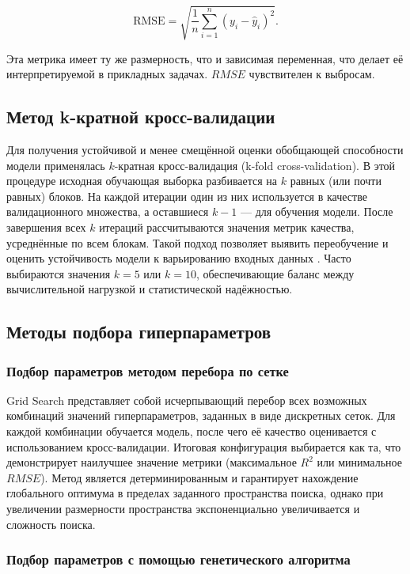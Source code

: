 \begin{equation}\label{ch1:RMSE}
\text{RMSE} = \sqrt{\frac{1}{n} \sum_{i=1}^{n} (y_i - \hat{y}_i)^2}.
\end{equation}

Эта метрика имеет ту же размерность, что и зависимая переменная, что делает её интерпретируемой в прикладных задачах. $RMSE$ чувствителен к выбросам.

\subsection{Метод k-кратной кросс-валидации}

Для получения устойчивой и менее смещённой оценки обобщающей способности модели применялась $k$-кратная кросс-валидация (k-fold cross-validation). В этой процедуре исходная обучающая выборка разбивается на $k$ равных (или почти равных) блоков. На каждой итерации один из них используется в качестве валидационного множества, а оставшиеся $k-1$ --- для обучения модели. После завершения всех $k$ итераций рассчитываются значения метрик качества, усреднённые по всем блокам. Такой подход позволяет выявить переобучение и оценить устойчивость модели к варьированию входных данных \cite{hastie2009elements}. Часто выбираются значения $k=5$ или $k=10$, обеспечивающие баланс между вычислительной нагрузкой и статистической надёжностью.

\subsection{Методы подбора гиперпараметров}


\subsubsection{Подбор параметров методом перебора по сетке}

Grid Search представляет собой исчерпывающий перебор всех возможных комбинаций значений гиперпараметров, заданных в виде дискретных сеток. Для каждой комбинации обучается модель, после чего её качество оценивается с использованием кросс-валидации. Итоговая конфигурация выбирается как та, что демонстрирует наилучшее значение метрики (максимальное $R^2$ или минимальное $RMSE$). Метод является детерминированным и гарантирует нахождение глобального оптимума в пределах заданного пространства поиска, однако при увеличении размерности пространства экспоненциально увеличивается и сложность поиска.

\subsubsection{Подбор параметров с помощью генетического алгоритма}

